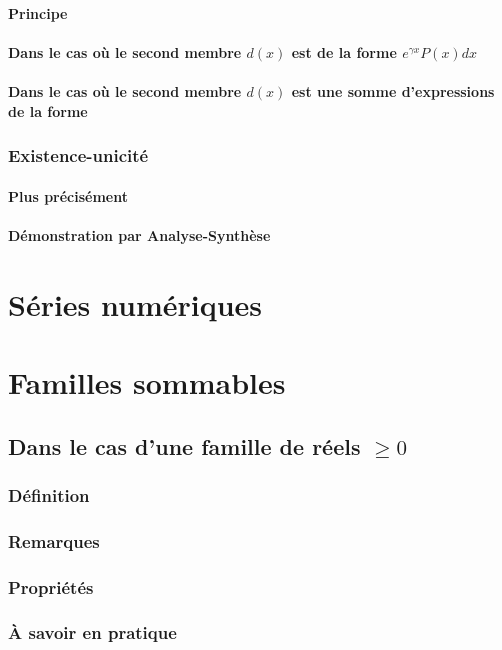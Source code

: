 \documentclass[12pt,a4paper,french]{book}
\begin{document}
			\subsubsection{Principe}
			\subsubsection{Dans le cas où le second membre $d(x)$ est de la forme  $e^{\gamma x}P(x)dx$}
			\subsubsection{Dans le cas où le second membre $d(x)$ est une somme d'expressions de la forme}
		\subsection{Existence-unicité}
			\subsubsection{Plus précisément}
			\subsubsection{Démonstration par Analyse-Synthèse}
			
\chapter{Séries numériques}
\chapter{Familles sommables}
	\section{Dans le cas d'une famille de réels $\geqslant 0$}
		\subsection{Définition}
		\subsection{Remarques}
		\subsection{Propriétés}
		\subsection{À savoir en pratique}
\end{document}
